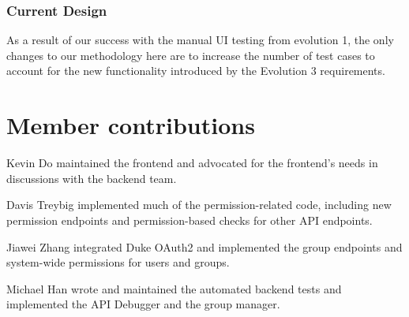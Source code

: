 \documentclass[12pt]{article}
\begin{document}
\subsubsection{Current Design}
As a result of our success with the manual UI testing from evolution 1, the only changes to our methodology here are to increase the number of test cases to account for the new functionality introduced by the Evolution 3 requirements.

\section{Member contributions}
Kevin Do maintained the frontend and advocated for the frontend's needs in discussions with the backend team.

Davis Treybig implemented much of the permission-related code, including new permission endpoints and permission-based checks for other API endpoints. 

Jiawei Zhang integrated Duke OAuth2 and implemented the group endpoints and system-wide permissions for users and groups.

Michael Han wrote and maintained the automated backend tests and implemented the API Debugger and the group manager.

\clearpage
\appendix
\end{document}
